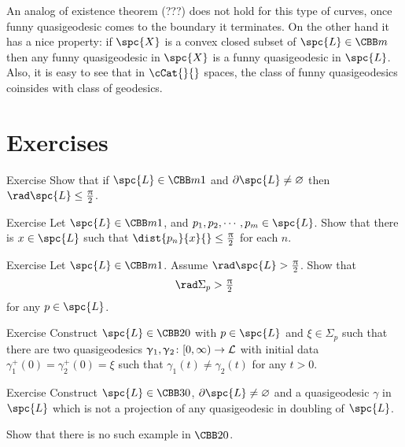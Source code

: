 An analog of existence theorem (???) does not hold for this type of curves,
once funny quasigeodesic comes to the boundary it terminates.
On the other hand it has a nice property: if $\spc{X}$ is a convex closed subset of $\spc{L}\in\CBB m{}$ then any funny quasigeodesic in $\spc{X}$ is a funny quasigeodesic in $\spc{L}$.
Also, it is easy to see that in $\cCat{}{}$ spaces, 
the class of funny quasigeodesics coinsides with class of geodesics.








\section{Exercises}

\begin{thm}{Exercise} Show that if $\spc{L}\in\CBB m1$ and $\partial \spc{L}\not=\emptyset$ then $\rad \spc{L}\le\tfrac\pi2$.
\end{thm}


\begin{thm}{Exercise}
Let $\spc{L}\in\CBB m1$, and $p_1,p_2,\cdots,p_m\in \spc{L}$. 
Show that there is $x\in \spc{L}$ such that $\dist{p_n}{x}{}\le\frac\pi2$ for each $n$.
\end{thm}

\begin{thm}{Exercise}
Let $\spc{L}\in\CBB m1$.
Assume $\rad\spc{L}>\tfrac\pi2$.
Show that 
\[\rad\Sigma_p>\tfrac\pi2\]
for any $p\in \spc{L}$.
\end{thm}

\begin{thm}{Exercise} Construct $\spc{L}\in\CBB 2 0$ with $p\in \spc{L}$ and $\xi\in \Sigma_p$ such that there are two quasigeodesics $\gamma_1,\gamma_2\:[0,\infty)\to \spc{L}$ with initial data $\gamma_1^+(0)=\gamma_2^+(0)=\xi$ such that $\gamma_1(t)\not=\gamma_2(t)$ for any $t>0$.
\end{thm}

\begin{thm}{Exercise} Construct $\spc{L}\in \CBB 3 0$, 
$\partial \spc{L}\not=\emptyset$ and a quasigeodesic $\gamma$ in $\spc{L}$ which is not a projection of any quasigeodesic in doubling of $\spc{L}$.

Show that there is no such example in $\CBB20$.
\end{thm}
